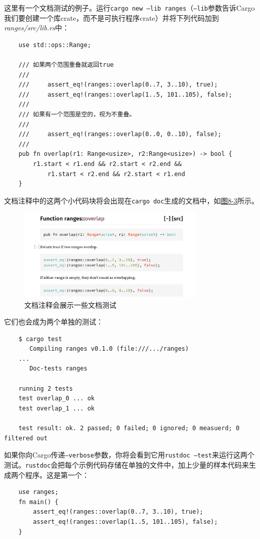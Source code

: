 这里有一个文档测试的例子。运行\texttt{cargo new --lib ranges}（\texttt{--lib}参数告诉Cargo我们要创建一个库crate，而不是可执行程序crate）并将下列代码加到\emph{ranges/src/lib.rs}中：
\begin{verbatim}
    use std::ops::Range;

    /// 如果两个范围重叠就返回true
    ///
    ///     assert_eq!(ranges::overlap(0..7, 3..10), true);
    ///     assert_eq!(ranges::overlap(1..5, 101..105), false);
    ///
    /// 如果有一个范围是空的，视为不重叠。
    ///
    ///     assert_eq!(ranges::overlap(0..0, 0..10), false);
    ///
    pub fn overlap(r1: Range<usize>, r2:Range<usize>) -> bool {
        r1.start < r1.end && r2.start < r2.end &&
            r1.start < r2.end && r2.start < r1.end
    }
\end{verbatim}

文档注释中的这两个小代码块将会出现在\texttt{cargo doc}生成的文档中，如\hyperref[f8-3]{图8-3}所示。

\begin{figure}[htbp]
    \centering
    \includegraphics[width=0.8\textwidth]{../img/f8-3.png}
    \caption{文档注释会展示一些文档测试}
    \label{f8-3}
\end{figure}

它们也会成为两个单独的测试：
\begin{verbatim}
    $ cargo test
       Compiling ranges v0.1.0 (file:///.../ranges)
    ...
       Doc-tests ranges

    running 2 tests
    test overlap_0 ... ok
    test overlap_1 ... ok

    test result: ok. 2 passed; 0 failed; 0 ignored; 0 measuerd; 0 filtered out
\end{verbatim}

如果你向Cargo传递\texttt{--verbose}参数，你将会看到它用\texttt{rustdoc --test}来运行这两个测试。\texttt{rustdoc}会把每个示例代码存储在单独的文件中，加上少量的样本代码来生成两个程序。这是第一个：
\begin{verbatim}
    use ranges;
    fn main() {
        assert_eq!(ranges::overlap(0..7, 3..10), true);
        assert_eq!(ranges::overlap(1..5, 101..105), false);
    }
\end{verbatim}

